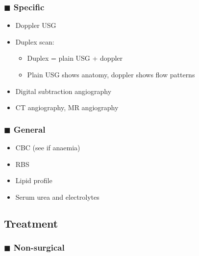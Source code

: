 \documentclass[
  12pt,
]{memoir}
\providecommand{\tightlist}{%
  \setlength{\itemsep}{0pt}\setlength{\parskip}{0pt}}
\begin{document}
\hypertarget{blacksquare-specific}{%
\subsubsection{\texorpdfstring{\(\blacksquare\)
Specific}{\textbackslash blacksquare Specific}}\label{blacksquare-specific}}

\begin{itemize}
\tightlist
\item
  Doppler USG
\item
  Duplex scan:

  \begin{itemize}
  \tightlist
  \item
    Duplex = plain USG + doppler
  \item
    Plain USG shows anatomy, doppler shows flow patterns
  \end{itemize}
\item
  Digital subtraction angiography
\item
  CT angiography, MR angiography
\end{itemize}

\hypertarget{blacksquare-general}{%
\subsubsection{\texorpdfstring{\(\blacksquare\)
General}{\textbackslash blacksquare General}}\label{blacksquare-general}}

\begin{itemize}
\tightlist
\item
  CBC (see if anaemia)
\item
  RBS
\item
  Lipid profile
\item
  Serum urea and electrolytes
\end{itemize}

\hypertarget{treatment-3}{%
\subsection{Treatment}\label{treatment-3}}

\hypertarget{blacksquare-non-surgical}{%
\subsubsection{\texorpdfstring{\(\blacksquare\)
Non-surgical}{\textbackslash blacksquare Non-surgical}}\label{blacksquare-non-surgical}}
\end{document}
